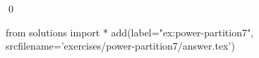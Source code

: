 
\begin{ex} 
  \label{ex:power-partition7}
  
  \qed
\end{ex} 
\begin{python0}
from solutions import *
add(label="ex:power-partition7",
    srcfilename='exercises/power-partition7/answer.tex') 
\end{python0}
